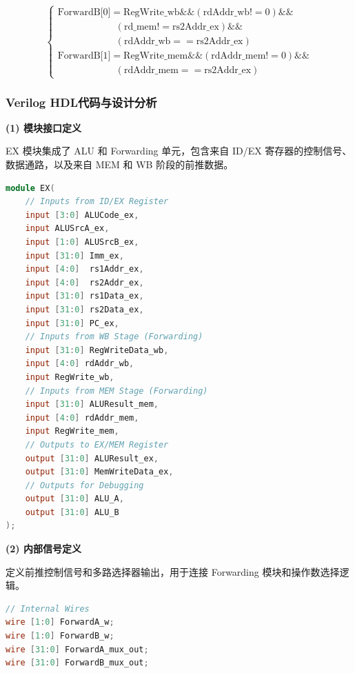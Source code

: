 \documentclass[12pt,a4paper]{article}
\begin{document}
\begin{equation}
\begin{cases}
\text{ForwardB[0]} = \text{RegWrite\_wb} \texttt{\&\&} (\text{rdAddr\_wb}!= 0) \texttt{\&\&} \\
\qquad\qquad\qquad (\text{rd\_mem}!= \text{rs2Addr\_ex}) \texttt{\&\&} \\
\qquad\qquad\qquad (\text{rdAddr\_wb} == \text{rs2Addr\_ex}) \\
\text{ForwardB[1]} = \text{RegWrite\_mem} \texttt{\&\&} (\text{rdAddr\_mem}!= 0) \texttt{\&\&} \\
\qquad\qquad\qquad (\text{rdAddr\_mem} == \text{rs2Addr\_ex})
\end{cases}
\tag{6.5.2}
\end{equation}

\subsubsection{Verilog HDL代码与设计分析}

\textbf{(1) 模块接口定义}

EX 模块集成了 ALU 和 Forwarding 单元，包含来自 ID/EX 寄存器的控制信号、数据通路，以及来自 MEM 和 WB 阶段的前推数据。

\begin{lstlisting}[language=verilog]
module EX(
    // Inputs from ID/EX Register
    input [3:0] ALUCode_ex,
    input ALUSrcA_ex,
    input [1:0] ALUSrcB_ex,
    input [31:0] Imm_ex,
    input [4:0]  rs1Addr_ex,
    input [4:0]  rs2Addr_ex,
    input [31:0] rs1Data_ex,
    input [31:0] rs2Data_ex,
    input [31:0] PC_ex,
    // Inputs from WB Stage (Forwarding)
    input [31:0] RegWriteData_wb,
    input [4:0] rdAddr_wb,
    input RegWrite_wb,
    // Inputs from MEM Stage (Forwarding)
    input [31:0] ALUResult_mem,
    input [4:0] rdAddr_mem,
    input RegWrite_mem,
    // Outputs to EX/MEM Register
    output [31:0] ALUResult_ex,
    output [31:0] MemWriteData_ex,
    // Outputs for Debugging
    output [31:0] ALU_A,
    output [31:0] ALU_B
);
\end{lstlisting}

\textbf{(2) 内部信号定义}

定义前推控制信号和多路选择器输出，用于连接 Forwarding 模块和操作数选择逻辑。

\begin{lstlisting}[language=verilog]
// Internal Wires
wire [1:0] ForwardA_w;
wire [1:0] ForwardB_w;
wire [31:0] ForwardA_mux_out;
wire [31:0] ForwardB_mux_out;
\end{lstlisting}
\end{document}
